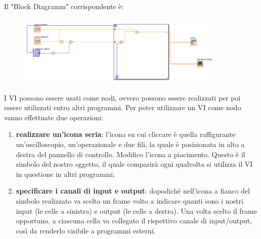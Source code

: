 Il "Block Diagramm" corrispondente è:
\begin{figure}[H]
\caption{}
    \includegraphics[width=10cm]{settimana_1/immagini/DiagrammVettore.png}
    \label{figura:diagramma}
    \centering
\end{figure}



I VI possono essere usati come nodi, ovvero possono essere realizzati per poi essere utilizzati entro altri programmi. Per poter utilizzare un VI come nodo vanno effettuate due operazioni:
\begin{enumerate}
    \item \textbf{realizzare un'icona seria}: l'icona su cui cliccare è quella raffigurante un'oscilloscopio, un'operazionale e due fili, la quale è posizionata in alto a destra del pannello di controllo. Modifico l'icona a piacimento. Questo è il simbolo del nostro oggetto, il quale comparirà ogni qualvolta si utilizza il VI in questione in altri programmi;
    \item \textbf{specificare i canali di input e output}: dopodiché nell'icona a fianco del simbolo realizzato va scelto un frame volto a indicare quanti sono i nostri input (le celle a sinistra) e output (le celle a destra). Una volta scelto il frame opportuno, a ciascuna cella va collegato il rispettivo canale di input/output, così da renderlo visibile a programmi esterni.
\end{enumerate}


